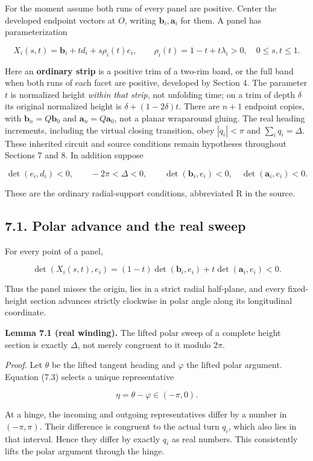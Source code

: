 \documentclass[
  11pt,
  letterpaper,
]{article}
\begin{document}
For the moment assume both runs of every panel are positive. Center the
developed endpoint vectors at \(O\), writing \(\mathbf b_i,\mathbf a_i\)
for them. A panel has parameterization

\[
X_i(s,t)=\mathbf b_i+t d_i+s\rho_i(t)e_i,
\qquad
\rho_i(t)=1-t+t\lambda_i>0,
\quad 0\le s,t\le1.
\tag{7.1}
\]

Here an \textbf{ordinary strip} is a positive trim of a two-rim band, or
the full band when both runs of each facet are positive, developed by
Section 4. The parameter \(t\) is normalized height \emph{within that
strip}, not unfolding time; on a trim of depth \(\delta\) its original
normalized height is \(\delta+(1-2\delta)t\). There are \(n+1\) endpoint
copies, with \(\mathbf b_n=Q\mathbf b_0\) and
\(\mathbf a_n=Q\mathbf a_0\), not a planar wraparound gluing. The real
heading increments, including the virtual closing transition, obey
\(|q_i|<\pi\) and \(\sum_iq_i=\Delta\). These inherited circuit and
source conditions remain hypotheses throughout Sections 7 and 8. In
addition suppose

\[
\det(e_i,d_i)<0,\qquad
-2\pi<\Delta<0,
\qquad
\det(\mathbf b_i,e_i)<0,
\quad\det(\mathbf a_i,e_i)<0.
\tag{7.2}
\]

These are the ordinary radial-support conditions, abbreviated R in the
source.

\subsection{7.1. Polar advance and the real
sweep}\label{polar-advance-and-the-real-sweep}

For every point of a panel,

\[
\det(X_i(s,t),e_i)
=(1-t)\det(\mathbf b_i,e_i)+t\det(\mathbf a_i,e_i)<0.
\tag{7.3}
\]

Thus the panel misses the origin, lies in a strict radial half-plane,
and every fixed-height section advances strictly clockwise in polar
angle along its longitudinal coordinate.

\textbf{Lemma 7.1 (real winding).} The lifted polar sweep of a complete
height section is exactly \(\Delta\), not merely congruent to it modulo
\(2\pi\).

\emph{Proof.} Let \(\theta\) be the lifted tangent heading and
\(\varphi\) the lifted polar argument. Equation (7.3) selects a unique
representative

\[
\eta=\theta-\varphi\in(-\pi,0).
\]

At a hinge, the incoming and outgoing representatives differ by a number
in \((-\pi,\pi)\). Their difference is congruent to the actual turn
\(q_i\), which also lies in that interval. Hence they differ by exactly
\(q_i\) as real numbers. This consistently lifts the polar argument
through the hinge.
\end{document}
